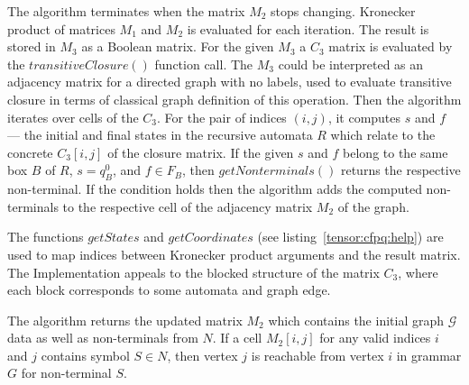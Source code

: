 The algorithm terminates when the matrix $M_2$ stops changing.
Kronecker product of matrices $M_1$ and $M_2$ is evaluated for each iteration.
The result is stored in $M_3$ as a Boolean matrix.
For the given $M_3$ a $C_3$ matrix is evaluated by the $transitiveClosure()$ function call.
The $M_3$ could be interpreted as an adjacency matrix for a directed graph with no labels, used to evaluate transitive closure in terms of classical graph definition of this operation.
Then the algorithm iterates over cells of the $C_3$.
For the pair of indices $(i,j)$, it computes $s$ and $f$ --- the initial and final states in the recursive automata $R$ which relate to the concrete $C_3[i,j]$ of the closure matrix.
If the given $s$ and $f$ belong to the same box $B$ of $R$, $s = q_B^0$, and $f \in F_B$, then $getNonterminals()$ returns the respective non-terminal.
If the condition holds then the algorithm adds the computed non-terminals to the respective cell of the adjacency matrix $M_2$ of the graph.

The functions $getStates$ and $getCoordinates$ (see listing~\ref{tensor:cfpq:help}) are used to map indices between Kronecker product arguments and the result matrix.
The Implementation appeals to the blocked structure of the matrix $C_3$, where each block corresponds to some automata and graph edge.

The algorithm returns the updated matrix $M_2$ which contains the initial graph $\mathcal{G}$ data as well as non-terminals from $N$.
If a cell $M_2[i,j]$ for any valid indices $i$ and $j$ contains symbol $S \in N$, then vertex $j$ is reachable from vertex $i$ in grammar $G$ for non-terminal $S$.


